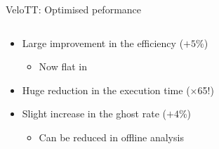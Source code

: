 \documentclass[aspectratio=1610]{beamer}
\begin{document}
\begin{frame}{VeloTT: Optimised peformance}

\begin{columns}
\begin{column}{0.65\textwidth}
\begin{itemize}
  \item Large improvement in the efficiency ($+5$\%)
  \begin{itemize}
    \item[\ding{70}] Now flat in \ptot
  \end{itemize}
  \item Huge reduction in the execution time ($\times$65!)
  \item Slight increase in the ghost rate ($+4$\%)
  \begin{itemize}
    \item[\ding{70}] Can be reduced in offline analysis
  \end{itemize}
\end{itemize}

\bigskip

\begin{mdframed}[linecolor=barcolor]
\begin{center}
\end{center}
\end{mdframed}
\end{column}


\end{columns}
\end{frame}
\end{document}
